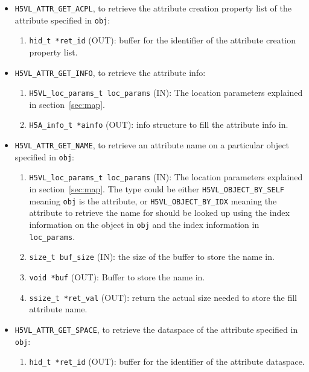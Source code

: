 \begin{itemize}

\item \texttt{H5VL\_ATTR\_GET\_ACPL}, to retrieve the attribute creation
  property list of the attribute specified in \texttt{obj}:
  \begin{enumerate}
  \item \texttt{hid\_t *ret\_id} (OUT): buffer for the identifier of the
    attribute creation property list.
  \end{enumerate}

\item \texttt{H5VL\_ATTR\_GET\_INFO}, to retrieve the attribute info:
  \begin{enumerate}
  \item \texttt{H5VL\_loc\_params\_t loc\_params} (IN): The location parameters
    explained in section~\ref{sec:map}. 
  \item \texttt{H5A\_info\_t *ainfo} (OUT): info structure to fill the
    attribute info in.
  \end{enumerate}

\item \texttt{H5VL\_ATTR\_GET\_NAME}, to retrieve an attribute name on a
  particular object specified in \texttt{obj}:
  \begin{enumerate}
  \item \texttt{H5VL\_loc\_params\_t loc\_params} (IN): The location parameters
    explained in section~\ref{sec:map}. The type could be either
    \texttt{H5VL\_OBJECT\_BY\_SELF} meaning \texttt{obj} is the attribute,
    or \texttt{H5VL\_OBJECT\_BY\_IDX} meaning the attribute to retrieve
    the name for should be looked up using the index information on
    the object in \texttt{obj} and the index information in \texttt{loc\_params}.
  \item \texttt{size\_t buf\_size} (IN): the size of the buffer to store
    the name in.
  \item \texttt{void *buf} (OUT): Buffer to store the name in.
  \item \texttt{ssize\_t *ret\_val} (OUT): return the actual size needed
    to store the fill attribute name.
  \end{enumerate}

\item \texttt{H5VL\_ATTR\_GET\_SPACE}, to retrieve the dataspace of the
  attribute specified in \texttt{obj}:
  \begin{enumerate}
  \item \texttt{hid\_t *ret\_id} (OUT): buffer for the identifier of the
    attribute dataspace.
  \end{enumerate}


\end{itemize}
